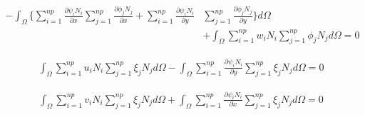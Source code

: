 \begin{equation}
 \begin{aligned}
  - \int_{\Omega} \Bigg\{ 
                  \sum\limits_{i=1}^{np} \frac{\partial \psi_i N_i}{\partial x} 
                  \sum\limits_{j=1}^{np} \frac{\partial \phi_j N_j}{\partial x} 
  +               \sum\limits_{i=1}^{np} \frac{\partial \psi_i N_i}{\partial y} 
                & \sum\limits_{j=1}^{np} \frac{\partial \phi_j N_j}{\partial y} 
  \Bigg\} d\Omega 
  \\[5pt]
  & + \int_{\Omega} \sum\limits_{i=1}^{np} w_i N_i 
                  \sum\limits_{j=1}^{np} \phi_j N_j d\Omega = 0
 \end{aligned}
\end{equation}

\begin{equation}
 \begin{aligned}
   \int_{\Omega} \sum\limits_{i=1}^{np} u_i N_i 
                 \sum\limits_{j=1}^{np} \xi_j N_j d\Omega
 - \int_{\Omega} \sum\limits_{i=1}^{np} \frac{\partial \psi_i N_i}{\partial y} 
                 \sum\limits_{j=1}^{np} \xi_j N_j d\Omega = 0
 \end{aligned}
\end{equation}

\begin{equation}
 \begin{aligned}
   \int_{\Omega} \sum\limits_{i=1}^{np} v_i N_i 
                 \sum\limits_{j=1}^{np} \xi_j N_j d\Omega
 + \int_{\Omega} \sum\limits_{i=1}^{np} \frac{\partial \psi_i N_i}{\partial x} 
                 \sum\limits_{j=1}^{np} \xi_j N_j d\Omega = 0
 \end{aligned}
\end{equation}

